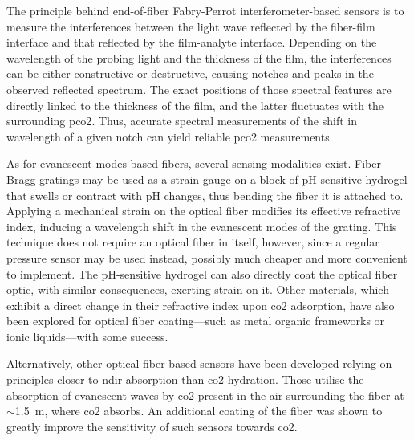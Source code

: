 The principle behind end-of-fiber Fabry-Perrot interferometer-based sensors is to measure the interferences between the light wave reflected by the fiber-film interface and that reflected by the film-analyte interface. Depending on the wavelength of the probing light and the thickness of the film, the interferences can be either constructive or destructive, causing notches and peaks in the observed reflected spectrum. The exact positions of those spectral features are directly linked to the thickness of the film, and the latter fluctuates with the surrounding \gls{pco2}. Thus, accurate spectral measurements of the shift in wavelength of a given notch can yield reliable \gls{pco2} measurements\cite{zheng2015, ma2018}.

As for evanescent modes-based fibers, several sensing modalities exist. Fiber Bragg gratings may be used as a strain gauge on a block of pH-sensitive hydrogel that swells or contract with pH changes, thus bending the fiber it is attached to\cite{quintero2010}. Applying a mechanical strain on the optical fiber modifies its effective refractive index\cite{hill1997}, inducing a wavelength shift in the evanescent modes of the grating. This technique does not require an optical fiber in itself, however, since a regular pressure sensor may be used instead, possibly much cheaper and more convenient to implement\cite{herber2004}. The pH-sensitive hydrogel can also directly coat the optical fiber optic, with similar consequences, exerting strain on it\cite{hu2015}. Other materials, which exhibit a direct change in their refractive index upon \gls{co2} adsorption, have also been explored for optical fiber coating---such as metal organic frameworks or ionic liquids---with some success\cite{hromadka2018, barrington2018}.

Alternatively, other optical fiber-based sensors have been developed relying on principles closer to \gls{ndir} absorption than \gls{co2} hydration. Those utilise the absorption of evanescent waves by \gls{co2} present in the air surrounding the fiber at $\sim$1.5~\textmu{}m, where \gls{co2} absorbs. An additional coating of the fiber was shown to greatly improve the sensitivity of such sensors towards \gls{co2}\cite{melo2014, chong2015}.


